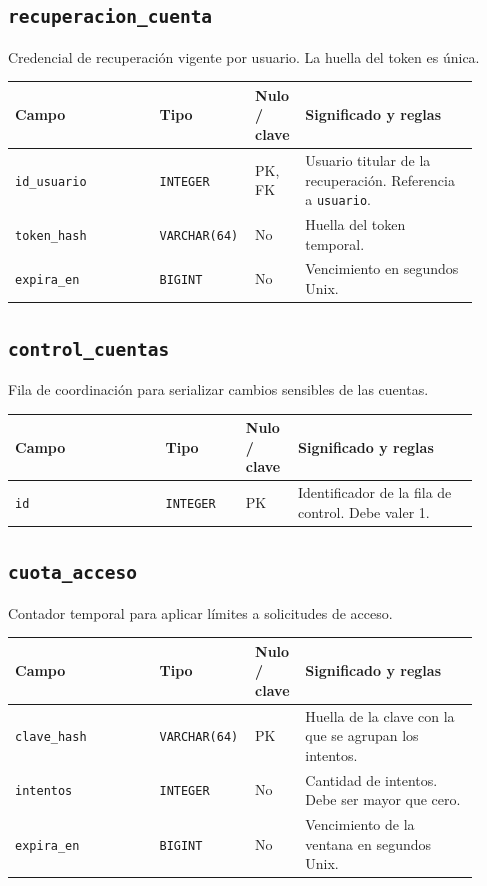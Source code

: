 \subsection*{\texttt{recuperacion\_\allowbreak{}cuenta}}

Credencial de recuperación vigente por usuario. La huella del token es única.

\noindent
\begin{tabular}{@{}p{0.30\linewidth}p{0.16\linewidth}p{0.10\linewidth}p{0.36\linewidth}@{}}
\hline
\textbf{Campo} & \textbf{Tipo} & \textbf{Nulo / clave} & \textbf{Significado y reglas} \\
\hline
\texttt{id\_\allowbreak{}usuario} & \texttt{INTEGER} & PK, FK & Usuario titular de la recuperación. Referencia a \texttt{usuario}. \\
\texttt{token\_\allowbreak{}hash} & \texttt{VARCHAR(64)} & No & Huella del token temporal. \\
\texttt{expira\_\allowbreak{}en} & \texttt{BIGINT} & No & Vencimiento en segundos Unix. \\
\hline
\end{tabular}

\subsection*{\texttt{control\_\allowbreak{}cuentas}}

Fila de coordinación para serializar cambios sensibles de las cuentas.

\noindent
\begin{tabular}{@{}p{0.30\linewidth}p{0.16\linewidth}p{0.10\linewidth}p{0.36\linewidth}@{}}
\hline
\textbf{Campo} & \textbf{Tipo} & \textbf{Nulo / clave} & \textbf{Significado y reglas} \\
\hline
\texttt{id} & \texttt{INTEGER} & PK & Identificador de la fila de control. Debe valer 1. \\
\hline
\end{tabular}

\subsection*{\texttt{cuota\_\allowbreak{}acceso}}

Contador temporal para aplicar límites a solicitudes de acceso.

\noindent
\begin{tabular}{@{}p{0.30\linewidth}p{0.16\linewidth}p{0.10\linewidth}p{0.36\linewidth}@{}}
\hline
\textbf{Campo} & \textbf{Tipo} & \textbf{Nulo / clave} & \textbf{Significado y reglas} \\
\hline
\texttt{clave\_\allowbreak{}hash} & \texttt{VARCHAR(64)} & PK & Huella de la clave con la que se agrupan los intentos. \\
\texttt{intentos} & \texttt{INTEGER} & No & Cantidad de intentos. Debe ser mayor que cero. \\
\texttt{expira\_\allowbreak{}en} & \texttt{BIGINT} & No & Vencimiento de la ventana en segundos Unix. \\
\hline
\end{tabular}

